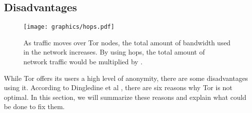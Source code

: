 \documentclass[12pt,journal,compsoc]{IEEEtran}
\begin{document}
	\subsection{Disadvantages}
		\label{ss:tor_disadvantages}
		
		\begin{figure*}[!t]
			\centering
			\texttt{[image: graphics/hops.pdf]}
			\caption{As traffic moves over Tor nodes, the total amount of bandwidth used in the network increases. By using  hops, the total amount of network traffic would be multiplied by .}
			\label{fig:hops}
		\end{figure*}

		While Tor offers its users a high level of anonymity, there are some disadvantages using it. According to Dingledine et al \cite{dingledine2009performance}, there are six reasons why Tor is not optimal. In this section, we will summarize these reasons and explain what could be done to fix them.
		
\end{document}
